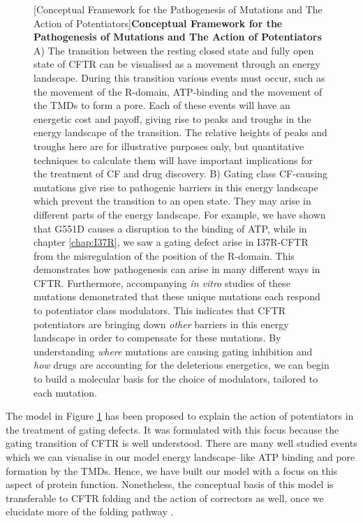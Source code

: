 \begin{figure}
	[Conceptual Framework for the Pathogenesis of Mutations and The Action of Potentiators]{\textbf{Conceptual Framework for the Pathogenesis of Mutations and The Action of Potentiators}{ A) The transition between the resting closed state and fully open state of CFTR can be visualised as a movement through an energy landscape. During this transition various events must occur, such as the movement of the R-domain, ATP-binding and the movement of the TMDs to form a pore. Each of these events will have an energetic cost and payoff, giving rise to peaks and troughs in the energy landscape of the transition. The relative heights of peaks and troughs here are for illustrative purposes only, but quantitative techniques to calculate them will have important implications for the treatment of CF and drug discovery. B) Gating class CF-causing mutations give rise to pathogenic barriers in this energy landscape which prevent the transition to an open state. They may arise in different parts of the energy landscape. For example, we have shown that G551D causes a disruption to the binding of ATP, while in chapter \ref{chap:I37R}, we saw a gating defect arise in I37R-CFTR from the misregulation of the position of the R-domain. This demonstrates how pathogenesis can arise in many different ways in CFTR. Furthermore, accompanying \textit{in vitro} studies of these mutations demonstrated that these unique mutations each respond to potentiator class modulators. This indicates that CFTR potentiators are bringing down \textit{other} barriers in this energy landscape in order to compensate for these mutations. By understanding \textit{where} mutations are causing gating inhibition and \textit{how} drugs are accounting for the deleterious energetics, we can begin to build a molecular basis for the choice of modulators, tailored to each mutation.}}
	\label{drug_action_model}

	\endgroup
\end{figure}

The model in Figure \ref {drug_action_model} has been proposed to explain the action of potentiators in the treatment of gating defects. It was formulated with this focus because the gating transition of CFTR is well understood. There are many well studied events which we can visualise in our model energy landscape--like ATP binding and pore formation by the TMDs. Hence, we have built our model with a focus on this aspect of protein function. Nonetheless, the conceptual basis of this model is transferable to CFTR folding and the action of correctors as well, once we elucidate more of the folding pathway \cite{krainer2018, kleizen2021, kleizen2020, padanyi2022, fiedorczuk2022}. 

